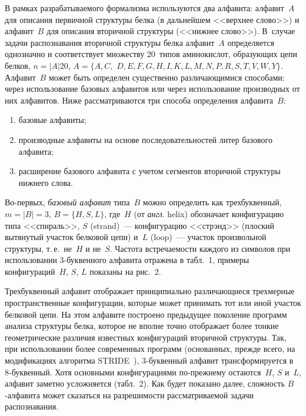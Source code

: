 \begin{multicols}{2}
    В рамках разрабатываемого формализма используются два алфавита: 
алфавит~$A$ для описа\-ния первичной структуры белка (в дальнейшем 
<<верхнее слово>>) и алфавит~$B$ для описа\-ния вторичной структуры 
(<<нижнее слово>>). В~случае задачи распознавания вторичной структуры 
белка алфавит~$A$ определяется однозначно и соответствует множеству 
20~типов аминокислот, образующих цепи белков, $n=\vert A\vert 20$, $A = \{A,C,$\linebreak  
$D, E, F, G, H, I, K, L, M, N, P, R, S, T, V, W, Y\}$. Ал\-фа\-вит~$B$ может быть 
определен существенно раз\-личающимися способами: через использование\linebreak 
базовых алфавитов или через использование производных от них алфавитов. 
Ниже рассматриваются три способа определения алфавита~$B$:
\begin{enumerate}[(1)]
\item   базовые алфавиты; 
\item    производные алфавиты на основе последовательностей литер базового 
алфавита; 
\item расширение базового алфавита с учетом сегментов вторичной структуры 
нижнего слова. 
\end{enumerate}

    Во-первых, \textit{базовый алфавит} типа~$B$ можно определить как 
трехбуквенный, $m = \vert B\vert = 3$, $B = \{H, S, L\}$, где~$H$ (от 
\textit{англ}. helix) обозначает конфигурацию типа <<спираль>>, 
$S$ (strand)~--- конфигурацию <<стрэнд>> (плоский вытянутый участок 
белковой цепи) и~$L$ (loop)~--- участок произвольной структуры, т.\,е.\ 
не~$H$ и не~$S$. Частота встреча\-емости каждого из символов при 
использовании 3-бук\-вен\-но\-го алфавита отражена в табл.~1, 
примеры конфигураций~$H$, $S$, $L$ показаны на рис.~2.

    Трехбуквенный алфавит отображает принципиально различающиеся 
трехмерные пространственные конфигурации, которые может принимать тот 
или иной участок белковой цепи. На этом алфавите построено предыдущее 
поколение программ анализа структуры белка, которое не вполне точно 
отображает более тонкие геометрические различия известных конфигураций 
вторичной структуры. Так, при использовании более современных программ 
(основанных, прежде всего, на модификациях алгоритма STRIDE~\cite{13tor}), 
3-бук\-вен\-ный алфавит трансформируется в 8-бук\-вен\-ный. Хотя основными 
конфигурациями по-прежнему остаются~$H$, $S$ и~$L$, алфавит заметно 
усложняется (табл.~2). Как будет показано далее, сложность 
$B$-алфавита может сказаться на разрешимости рассматриваемой задачи 
распозна\-вания.


\end{multicols}
